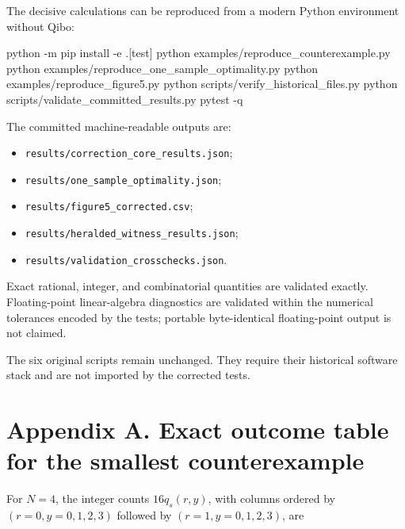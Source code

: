 \documentclass[
  10pt,
]{article}
\newenvironment{Shaded}{}{}
\newcommand{\AttributeTok}[1]{\textcolor[rgb]{0.49,0.56,0.16}{#1}}
\newcommand{\ExtensionTok}[1]{#1}
\newcommand{\NormalTok}[1]{#1}
\newcommand{\PreprocessorTok}[1]{\textcolor[rgb]{0.74,0.48,0.00}{#1}}
\newcommand{\SpecialStringTok}[1]{\textcolor[rgb]{0.73,0.40,0.53}{#1}}
\providecommand{\tightlist}{%
  \setlength{\itemsep}{0pt}\setlength{\parskip}{0pt}}
\begin{document}
The decisive calculations can be reproduced from a modern Python
environment without Qibo:

\begin{Shaded}
\begin{Highlighting}[]
\ExtensionTok{python} \AttributeTok{{-}m}\NormalTok{ pip install }\AttributeTok{{-}e}\NormalTok{ .}\PreprocessorTok{[}\SpecialStringTok{test}\PreprocessorTok{]}
\ExtensionTok{python}\NormalTok{ examples/reproduce\_counterexample.py}
\ExtensionTok{python}\NormalTok{ examples/reproduce\_one\_sample\_optimality.py}
\ExtensionTok{python}\NormalTok{ examples/reproduce\_figure5.py}
\ExtensionTok{python}\NormalTok{ scripts/verify\_historical\_files.py}
\ExtensionTok{python}\NormalTok{ scripts/validate\_committed\_results.py}
\ExtensionTok{pytest} \AttributeTok{{-}q}
\end{Highlighting}
\end{Shaded}

The committed machine-readable outputs are:

\begin{itemize}
\tightlist
\item
  \texttt{results/correction\_core\_results.json};
\item
  \texttt{results/one\_sample\_optimality.json};
\item
  \texttt{results/figure5\_corrected.csv};
\item
  \texttt{results/heralded\_witness\_results.json};
\item
  \texttt{results/validation\_crosschecks.json}.
\end{itemize}

Exact rational, integer, and combinatorial quantities are validated
exactly. Floating-point linear-algebra diagnostics are validated within
the numerical tolerances encoded by the tests; portable byte-identical
floating-point output is not claimed.

The six original scripts remain unchanged. They require their historical
software stack and are not imported by the corrected tests.

\section{Appendix A. Exact outcome table for the smallest
counterexample}\label{appendix-a.-exact-outcome-table-for-the-smallest-counterexample}

For \(N=4\), the integer counts \(16q_s(r,y)\), with columns ordered by
\((r=0,y=0,1,2,3)\) followed by \((r=1,y=0,1,2,3)\), are
\end{document}
